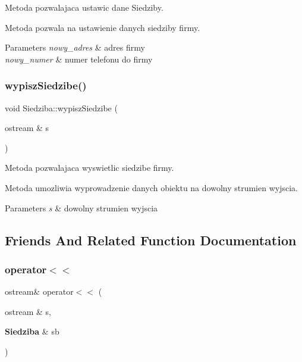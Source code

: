 Metoda pozwalajaca ustawic dane Siedziby. 

Metoda pozwala na ustawienie danych siedziby firmy. 
\begin{DoxyParams}{Parameters}
{\em nowy\+\_\+adres} & adres firmy \\
\hline
{\em nowy\+\_\+numer} & numer telefonu do firmy \\
\hline
\end{DoxyParams}
\mbox{\label{class_siedziba_a6f88b7a631efa99b8203154338d79c55}} 
\subsubsection{wypisz\+Siedzibe()}
{\footnotesize\ttfamily void Siedziba\+::wypisz\+Siedzibe (\begin{DoxyParamCaption}\item[{ostream \&}]{s }\end{DoxyParamCaption})}



Metoda pozwalajaca wyswietlic siedzibe firmy. 

Metoda umozliwia wyprowadzenie danych obiektu na dowolny strumien wyjscia. 
\begin{DoxyParams}{Parameters}
{\em s} & dowolny strumien wyjscia \\
\hline
\end{DoxyParams}


\subsection{Friends And Related Function Documentation}
\mbox{\label{class_siedziba_a9f6b107d8d81cef2e0ed0a865b1790f9}} 
\subsubsection{operator$<$$<$}
{\footnotesize\ttfamily ostream\& operator$<$$<$ (\begin{DoxyParamCaption}\item[{ostream \&}]{s,  }\item[{\textbf{ Siedziba} \&}]{sb }\end{DoxyParamCaption})\hspace{0.3cm}{\ttfamily [friend]}}



